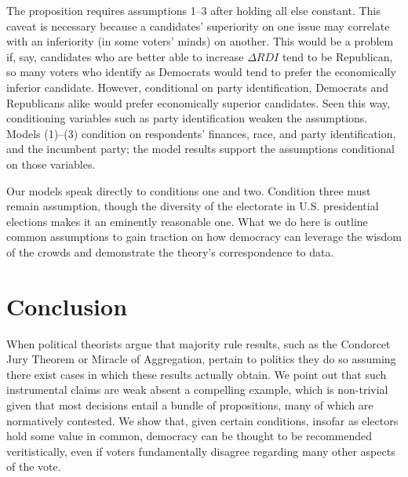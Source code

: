 \documentclass[11pt]{article}
\begin{document}
The proposition requires assumptions 1--3 after holding all
else constant.%
This caveat is necessary because a candidates' superiority on one
issue may correlate with an inferiority (in some voters' minds) on
another. 
This would be a problem if, say, candidates who are better able to
increase $\Delta RDI$ tend to be Republican, so many voters who identify as
Democrats would tend to prefer the economically inferior candidate. 
However, conditional on party identification, Democrats and
Republicans alike would prefer economically superior candidates.
Seen this way, conditioning variables such as party identification
weaken the assumptions.
Models (1)--(3) condition on respondents' finances, race, and party
identification, and the incumbent party; the model results support the
assumptions conditional on those variables. 

Our models speak directly to conditions one and two. Condition three must remain assumption, though the diversity of the electorate in U.S. presidential elections makes it an eminently reasonable one.  
 What we do here is outline common assumptions to gain traction on how democracy can leverage the wisdom of the crowds and demonstrate the theory's correspondence to data. 

\section{Conclusion}
When political  theorists argue that majority rule results, such as the Condorcet Jury Theorem or Miracle of Aggregation, pertain to politics they do so assuming there exist cases in which these results actually obtain. We point out that such instrumental claims are weak absent a compelling example, which is non-trivial given that most decisions entail a bundle of propositions, many of which are normatively contested. We show that, given certain conditions, insofar as electors hold some value in common, democracy can be thought to be recommended veritistically, even if voters fundamentally disagree regarding many other aspects of the vote.
\end{document}
